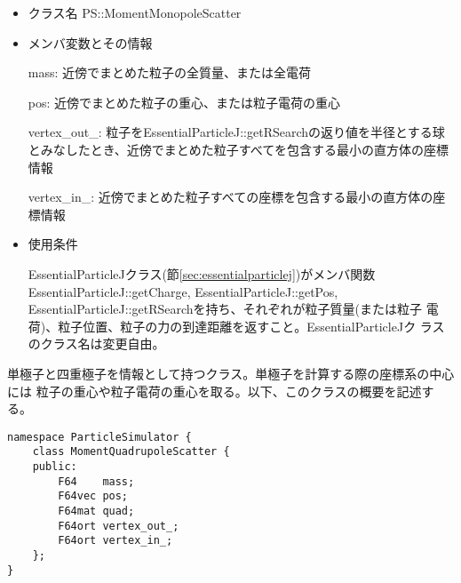 \begin{itemize}
\item クラス名
  PS::MomentMonopoleScatter

\item メンバ変数とその情報

  mass: 近傍でまとめた粒子の全質量、または全電荷

  pos: 近傍でまとめた粒子の重心、または粒子電荷の重心
  
  vertex\_out\_: 粒子をEssentialParticleJ::getRSearchの返り値を半径とする球とみなしたとき、近傍でまとめた粒子すべてを包含する最小の直方体の座標情報
  
  vertex\_in\_: 近傍でまとめた粒子すべての座標を包含する最小の直方体の座標情報

\item 使用条件

  EssentialParticleJクラス(節\ref{sec:essentialparticlej})がメンバ関数
  EssentialParticleJ::getCharge, EssentialParticleJ::getPos,
  EssentialParticleJ::getRSearchを持ち、それぞれが粒子質量(または粒子
  電荷)、粒子位置、粒子の力の到達距離を返すこと。EssentialParticleJク
  ラスのクラス名は変更自由。

\end{itemize}

\label{sec:MomentQuadrupoleScatter}

単極子と四重極子を情報として持つクラス。単極子を計算する際の座標系の中心には
粒子の重心や粒子電荷の重心を取る。以下、このクラスの概要を記述する。
\begin{screen}
\begin{verbatim}
namespace ParticleSimulator {
    class MomentQuadrupoleScatter {
    public:
        F64    mass;
        F64vec pos;
        F64mat quad;
        F64ort vertex_out_;
        F64ort vertex_in_;
    };
}
\end{verbatim}
\end{screen}

